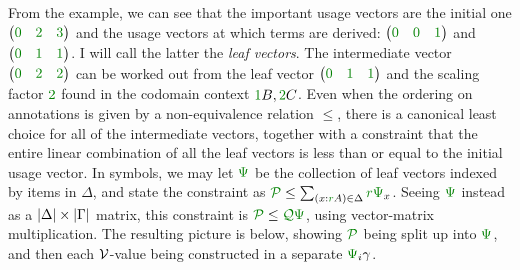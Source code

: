 From the example, we can see that the important usage vectors are the initial
one $\begin{pmatrix} \gr0 & \gr2 & \gr3 \end{pmatrix}$ and the usage vectors
at which terms are derived: $\begin{pmatrix} \gr0 & \gr0 & \gr1 \end{pmatrix}$
and $\begin{pmatrix} \gr0 & \gr1 & \gr1 \end{pmatrix}$.
I will call the latter the \emph{leaf vectors}.
The intermediate vector $\begin{pmatrix} \gr0 & \gr2 & \gr2 \end{pmatrix}$ can
be worked out from the leaf vector
$\begin{pmatrix} \gr0 & \gr1 & \gr1 \end{pmatrix}$ and the scaling factor
$\gr2$ found in the codomain context $\gr1B, \gr2C$.
Even when the ordering on annotations is given by a non-equivalence relation
$\leq$, there is a canonical least choice for all of the intermediate vectors,
together with a constraint that the entire linear combination of all the leaf
vectors is less than or equal to the initial usage vector.
In symbols, we may let $\gr\Psi$ be the collection of leaf vectors indexed by
items in $\Delta$, and state
the constraint as $\grP \leq \sum_{\plr{x : \gr rA} \in \Delta} \gr r\gr\Psi_x$.
Seeing $\gr\Psi$ instead as a $\size\Delta \times \size\Gamma$ matrix, this
constraint is $\grP \leq \grQ\gr\Psi$, using vector-matrix multiplication.
The resulting picture is below, showing $\grP$ being split up into $\gr\Psi$,
and then each $\mathcal V$-value being constructed in a separate $\gr\Psi_i\gamma$.


